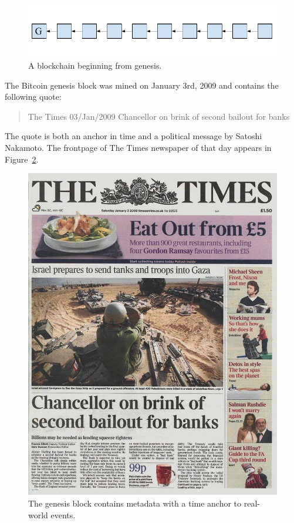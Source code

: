 \begin{figure}[h]
    \centering
    \includegraphics[width=0.7 \columnwidth,keepaspectratio]{figures/genesis-chain.pdf}
    \caption{A blockchain beginning from genesis.}
    \label{fig.genesischain}
\end{figure}

The Bitcoin genesis block was mined on January 3rd, 2009 and contains the following quote:

\begin{quote}
  The Times 03/Jan/2009 Chancellor on brink of second bailout for banks
\end{quote}

The quote is both an anchor in time and a political message by Satoshi Nakamoto. The
frontpage of The Times newspaper of that day appears in Figure~\ref{fig.thetimes}.

\begin{figure}[h]
    \centering
    \includegraphics[width=1 \columnwidth,keepaspectratio]{figures/thetimes.jpg}
    \caption{The genesis block contains metadata with a time anchor to real-world events.}
    \label{fig.thetimes}
\end{figure}

